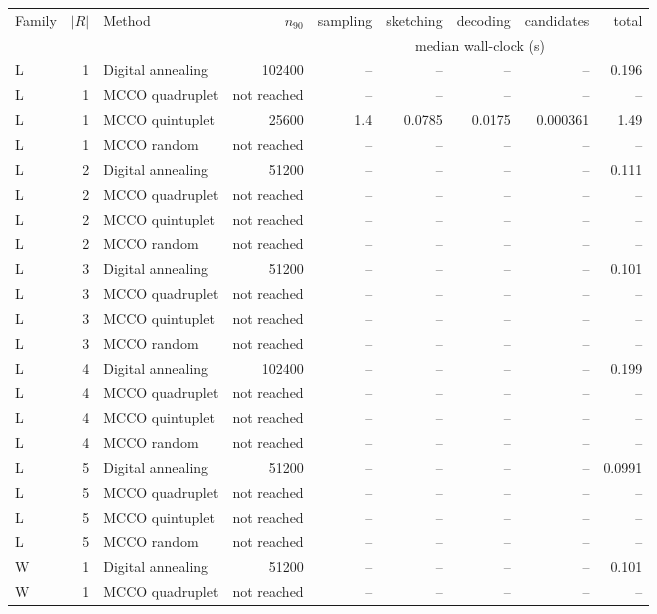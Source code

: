 \begin{tabular}{lrlrrrrrr}
\hline
Family & $|R|$ & Method & $n_{90}$ & sampling & sketching & decoding & candidates & total \\
 & & & & \multicolumn{5}{c}{median wall-clock (s)} \\
\hline
L & 1 & Digital annealing & 102400 & -- & -- & -- & -- & 0.196 \\
L & 1 & MCCO quadruplet & not reached & -- & -- & -- & -- & -- \\
L & 1 & MCCO quintuplet & 25600 & 1.4 & 0.0785 & 0.0175 & 0.000361 & 1.49 \\
L & 1 & MCCO random & not reached & -- & -- & -- & -- & -- \\
L & 2 & Digital annealing & 51200 & -- & -- & -- & -- & 0.111 \\
L & 2 & MCCO quadruplet & not reached & -- & -- & -- & -- & -- \\
L & 2 & MCCO quintuplet & not reached & -- & -- & -- & -- & -- \\
L & 2 & MCCO random & not reached & -- & -- & -- & -- & -- \\
L & 3 & Digital annealing & 51200 & -- & -- & -- & -- & 0.101 \\
L & 3 & MCCO quadruplet & not reached & -- & -- & -- & -- & -- \\
L & 3 & MCCO quintuplet & not reached & -- & -- & -- & -- & -- \\
L & 3 & MCCO random & not reached & -- & -- & -- & -- & -- \\
L & 4 & Digital annealing & 102400 & -- & -- & -- & -- & 0.199 \\
L & 4 & MCCO quadruplet & not reached & -- & -- & -- & -- & -- \\
L & 4 & MCCO quintuplet & not reached & -- & -- & -- & -- & -- \\
L & 4 & MCCO random & not reached & -- & -- & -- & -- & -- \\
L & 5 & Digital annealing & 51200 & -- & -- & -- & -- & 0.0991 \\
L & 5 & MCCO quadruplet & not reached & -- & -- & -- & -- & -- \\
L & 5 & MCCO quintuplet & not reached & -- & -- & -- & -- & -- \\
L & 5 & MCCO random & not reached & -- & -- & -- & -- & -- \\
W & 1 & Digital annealing & 51200 & -- & -- & -- & -- & 0.101 \\
W & 1 & MCCO quadruplet & not reached & -- & -- & -- & -- & -- \\

\end{tabular}
